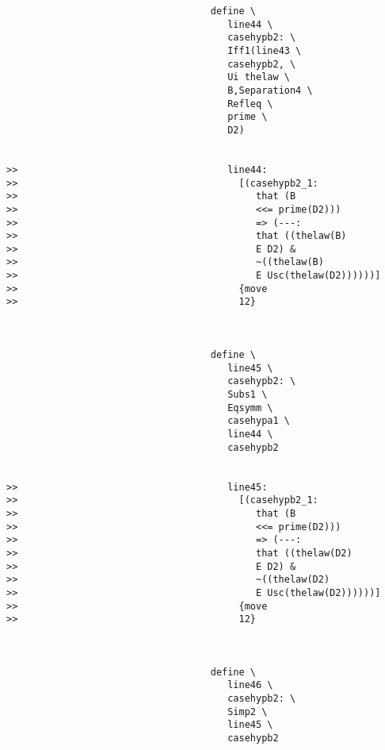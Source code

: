 \documentclass[12pt]{article}
\begin{document}
\begin{verbatim}
                                    define \
                                       line44 \
                                       casehypb2: \
                                       Iff1(line43 \
                                       casehypb2, \
                                       Ui thelaw \
                                       B,Separation4 \
                                       Refleq \
                                       prime \
                                       D2)


>>                                     line44:
>>                                       [(casehypb2_1:
>>                                          that (B
>>                                          <<= prime(D2)))
>>                                          => (---:
>>                                          that ((thelaw(B)
>>                                          E D2) &
>>                                          ~((thelaw(B)
>>                                          E Usc(thelaw(D2))))))]
>>                                       {move
>>                                       12}



                                    define \
                                       line45 \
                                       casehypb2: \
                                       Subs1 \
                                       Eqsymm \
                                       casehypa1 \
                                       line44 \
                                       casehypb2


>>                                     line45:
>>                                       [(casehypb2_1:
>>                                          that (B
>>                                          <<= prime(D2)))
>>                                          => (---:
>>                                          that ((thelaw(D2)
>>                                          E D2) &
>>                                          ~((thelaw(D2)
>>                                          E Usc(thelaw(D2))))))]
>>                                       {move
>>                                       12}



                                    define \
                                       line46 \
                                       casehypb2: \
                                       Simp2 \
                                       line45 \
                                       casehypb2



\end{verbatim}
\end{document}
